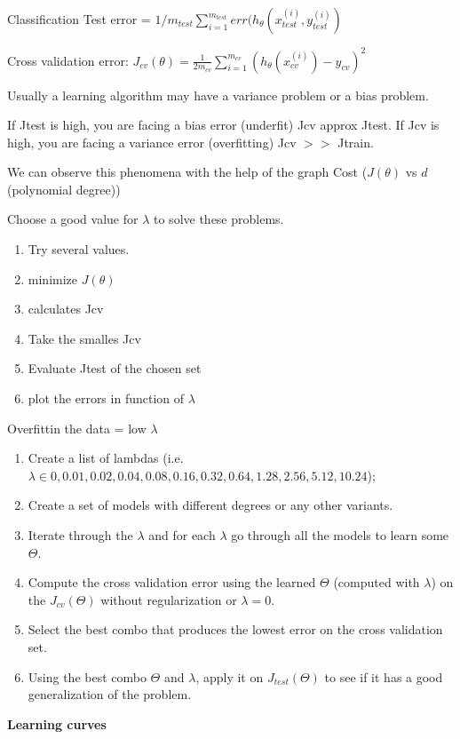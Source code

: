\documentclass[12pt,a4paper]{report}
\begin{document}
Classification Test error = $1/m_{test}\sum_{i=1}^ {m_{test}}err(h_\theta(x_{test}^{(i)}, y_{test}^{(i)})$

Cross validation error: $J_{cv}(\theta) = \frac{1}{2m_{cv}}\sum_{i=1}^ {m_{cv}}(h_\theta(x_{cv}^{(i)}) - y_{cv})^{2}$

Usually a learning algorithm may have a variance problem or a bias problem.

If Jtest is high, you are facing a bias error (underfit) Jcv approx Jtest. If Jcv is high, you are facing a variance error (overfitting) Jcv $>>$ Jtrain.
	
	We can observe this phenomena with the help of the graph Cost ($J(\theta)$ vs $d$ (polynomial degree))
	
	Choose a good value for $\lambda$ to solve these problems. 
\begin{enumerate}
\item Try several values.
\item minimize $J(\theta)$
\item calculates Jcv
\item Take the smalles Jcv
\item Evaluate Jtest of the chosen set
\item plot the errors in function of $\lambda$
\end{enumerate}	
	
	Overfittin the data  = low $\lambda$
	\begin{enumerate}
	\item Create a list of lambdas (i.e. $\lambda\in {0,0.01,0.02,0.04,0.08,0.16,0.32,0.64,1.28,2.56,5.12,10.24}$);
\item Create a set of models with different degrees or any other variants.
\item Iterate through the $\lambda$ and for each $\lambda$ go through all the models to learn some $\Theta$.
\item Compute the cross validation error using the learned $\Theta$ (computed with $\lambda$) on the $J_{cv}(\Theta)$ without regularization or $\lambda = 0$.
\item Select the best combo that produces the lowest error on the cross validation set.
\item Using the best combo $\Theta$ and $\lambda$, apply it on $J_{test}(\Theta)$ to see if it has a good generalization of the problem.
	\end{enumerate}	
	
	
	\textbf{Learning curves}	
	
\end{document}

